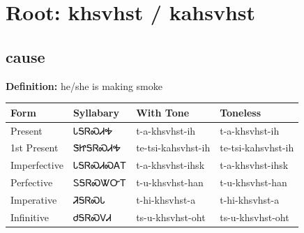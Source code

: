 \documentclass{article}%
\begin{document}
%
\normalsize%
\section*{Root: khsvhst / kahsvhst}%
\subsection*{cause}%
\textbf{Definition: }%
he/she is making smoke%
\\[0.5em]%
\begin{tabular}{|l|l|l|l|}%
\hline%
\textbf{Form}&\textbf{Syllabary}&\textbf{With Tone}&\textbf{Toneless}\\%
\hline%
Present&ᏓᎦᏒᏍᏗᎭ&t{-}a{-}khsvhst{-}ih&t{-}a{-}khsvhst{-}ih\\%
1st Present&ᏕᏥᎦᏒᏍᏗᎭ&te{-}tsi{-}kahsvhst{-}ih&te{-}tsi{-}kahsvhst{-}ih\\%
Imperfective&ᏓᎦᏒᏍᏗᏍᎪᎢ&t{-}a{-}khsvhst{-}ihsk&t{-}a{-}khsvhst{-}ihsk\\%
Perfective&ᏚᎦᏒᏍᏔᏅᎢ&t{-}u{-}khsvhst{-}han&t{-}u{-}khsvhst{-}han\\%
Imperative&ᏘᎦᏒᏍᏓ&t{-}hi{-}khsvhst{-}a&t{-}hi{-}khsvhst{-}a\\%
Infinitive&ᏧᎦᏒᏍᏙᏗ&ts{-}u{-}khsvhst{-}oht&ts{-}u{-}khsvhst{-}oht\\%
\hline%
\end{tabular}%
\\[1em]%
\end{document}
